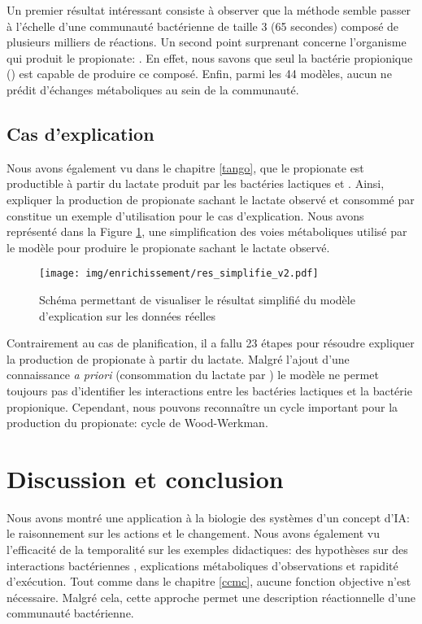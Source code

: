 \documentclass[../main.tex]{subfiles}
\begin{document}
Un premier résultat intéressant consiste à observer que la méthode semble passer à l'échelle d'une communauté bactérienne de taille 3 (65 secondes) composé de plusieurs milliers de réactions. Un second point surprenant concerne l'organisme qui produit le propionate: \lactis. En effet, nous savons que seul la bactérie propionique (\freud) est capable de produire ce composé. Enfin, parmi les 44 modèles, aucun ne prédit d'échanges métaboliques au sein de la communauté. \\

\subsection{Cas d'explication}
Nous avons également vu dans le chapitre \ref{tango}, que le propionate est productible à partir du lactate produit par les bactéries lactiques \lactis et \plantarum.  Ainsi, expliquer la production de propionate sachant le lactate observé et consommé par \freud constitue un exemple d'utilisation pour le cas d'explication. Nous avons représenté dans la Figure \ref{fig:explication_r}, une simplification des voies métaboliques utilisé par le modèle pour produire le propionate sachant le lactate observé.

\begin{figure}[H]
\centering
        \texttt{[image: img/enrichissement/res\_simplifie\_v2.pdf]}
            \caption{Schéma permettant de visualiser le résultat simplifié du modèle d'explication sur les données réelles}
        \label{fig:explication_r}
\end{figure}

Contrairement au cas de planification, il a fallu 23 étapes pour résoudre expliquer la production de propionate à partir du lactate. Malgré l'ajout d'une connaissance \textit{a priori} (consommation du lactate par \freud) le modèle ne permet toujours pas d'identifier les interactions entre les bactéries lactiques et la bactérie propionique. Cependant, nous pouvons reconnaître un cycle important pour la production du propionate: cycle de Wood-Werkman.


\section{Discussion et conclusion}
Nous avons montré une application à la biologie des systèmes d'un concept d'IA: le raisonnement sur les actions et le changement. Nous avons également vu l'efficacité de la temporalité sur les exemples didactiques: des hypothèses sur des interactions bactériennes , explications métaboliques d'observations et rapidité d'exécution. Tout comme dans le chapitre \ref{ccmc}, aucune fonction objective n'est nécessaire. Malgré cela, cette approche permet une description réactionnelle d'une communauté bactérienne.\\
\end{document}
